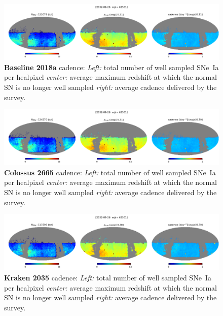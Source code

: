 \begin{figure}[h!]
  \begin{center}
    \includegraphics[width=\linewidth]{Figures/baseline2018a_64_maps.png}
    \caption{{\bf Baseline 2018a} cadence: {\em Left:} total number of well
      sampled SNe~Ia per healpixel {\em center:} average maximum
      redshift at which the normal SN is no longer well sampled {\em
        right:} average cadence delivered by the survey.}
  \end{center}
  \label{fig:baseline2018}
\end{figure}

\begin{figure}[h!]
  \begin{center}
    \includegraphics[width=\linewidth]{Figures/colossus_2665_64_maps.png}
    \caption{{\bf Colossus 2665} cadence: {\em Left:} total number of well
      sampled SNe~Ia per healpixel {\em center:} average maximum
      redshift at which the normal SN is no longer well sampled {\em
        right:} average cadence delivered by the survey.}
  \end{center}
  \label{fig:colossus_2665}
\end{figure}

\begin{figure}[h!]
  \begin{center}
    \includegraphics[width=\linewidth]{Figures/kraken_2035_64_maps.png}
    \caption{{\bf Kraken 2035} cadence: {\em Left:} total number of well
      sampled SNe~Ia per healpixel {\em center:} average maximum
      redshift at which the normal SN is no longer well sampled {\em
        right:} average cadence delivered by the survey.}
  \end{center}
  \label{fig:kraken_2035}
\end{figure}

